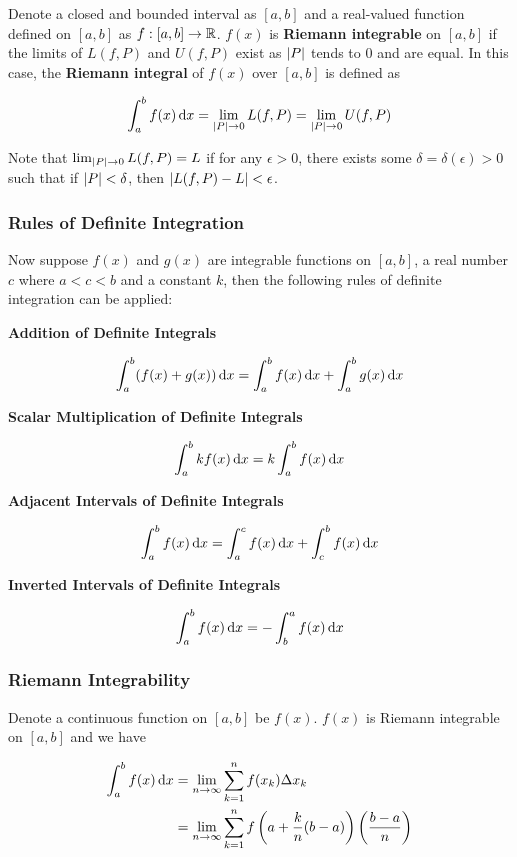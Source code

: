 \documentclass[a4paper,12pt]{article}
\begin{document}
\begin{dft}
  Denote a closed and bounded interval as $[a,b]$ and a real-valued function defined on $[a,b]$ as $f: [a,b]\to\mathbb{R}$. $f(x)$ is \textbf{Riemann integrable} on $[a,b]$ if the limits of $L(f,P)$ and $U(f,P)$ exist as $\left| P\right|$ tends to $0$ and are equal. In this case, the \textbf{Riemann integral} of $f(x)$ over $[a,b]$ is defined as

  $$\int_{a}^{b}f(x)\,\mathrm{d} x=\lim_{\left| P\right|\to 0}L(f,P)=\lim_{\left| P\right|\to 0}U(f,P)$$\s

  Note that $\lim_{\left| P\right|\to 0}L(f,P)=L$ if for any $\epsilon>0$, there exists some $\delta=\delta(\epsilon)>0$ such that if $\left| P\right|<\delta$, then $\left| L(f,P)-L\right|<\epsilon$.
\end{dft}

\subsubsection{Rules of Definite Integration}
\begin{pst}
  Now suppose $f(x)$ and $g(x)$ are integrable functions on $[a,b]$, a real number $c$ where $a<c<b$ and a constant $k$, then the following rules of definite integration can be applied:

  \begin{alist}
    \item \textbf{Addition of Definite Integrals}

    $$\int_{a}^{b}(f(x)+g(x))\,\mathrm{d} x=\int_{a}^{b}f(x)\,\mathrm{d} x+\int_{a}^{b}g(x)\,\mathrm{d} x$$

    \item \textbf{Scalar Multiplication of Definite Integrals}

    $$\int_{a}^{b}kf(x)\,\mathrm{d} x=k\int_{a}^{b}f(x)\,\mathrm{d} x$$

    \item \textbf{Adjacent Intervals of Definite Integrals}

    $$\int_{a}^{b}f(x)\,\mathrm{d} x=\int_{a}^{c}f(x)\,\mathrm{d} x+\int_{c}^{b}f(x)\,\mathrm{d} x$$

    \item \textbf{Inverted Intervals of Definite Integrals}

    $$\int_{a}^{b}f(x)\,\mathrm{d} x=-\int_{b}^{a}f(x)\,\mathrm{d} x$$
  \end{alist}
\end{pst}

\subsubsection{Riemann Integrability}
\begin{thm}
  Denote a continuous function on $[a,b]$ be $f(x)$. $f(x)$ is Riemann integrable on $[a,b]$ and we have

  $$\begin{aligned}[t]
    \int_{a}^{b}f(x)\,\mathrm{d} x&=\lim_{n\to\infty}\sum_{k=1}^{n}f(x_{k})\Delta x_{k}\\
    &=\lim_{n\to\infty}\sum_{k=1}^{n}f\left( a+\frac{k}{n}(b-a)\right)\left( \frac{b-a}{n}\right)
  \end{aligned}$$
\end{thm}
\end{document}
